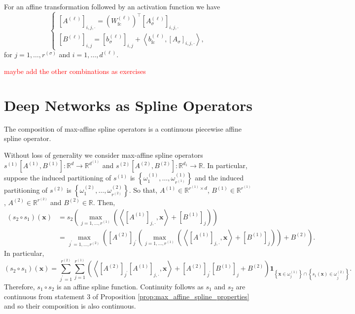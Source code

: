 \begin{example}
    For an affine transformation followed by an activation function we have $$\begin{cases}\left[A^{(\ell)}\right]_{i,j,\cdot}=\left(W_{\text{fc}}^{(\ell)}\right)^\top\left[A_{\sigma}^{(\ell)}\right]_{i,j,\cdot}\\\left[B^{(\ell)}\right]_{i,j}=\left[b_{\sigma}^{(\ell)}\right]_{i,j}+\left\langle b_{\text{fc}}^{(\ell)},\left[A_{\sigma}\right]_{i,j,\cdot}\right\rangle,\end{cases}$$for $j=1,\dots,r^{(\sigma)}$ and $i=1,\dots,d^{(\ell)}$.
\end{example}

\textcolor{Red}{maybe add the other combinations as exercises}

\section{Deep Networks as Spline Operators}\label{sec:dn_as_so}

\begin{proposition}
    The composition of max-affine spline operators is a continuous piecewise affine spline operator.
\end{proposition}

\begin{tproof}
    Without loss of generality we consider max-affine spline operators $s^{(1)}\left[A^{(1)},B^{(1)}\right]:\mathbb{R}^d\to\mathbb{R}^{d^{(1)}}$ and $s^{(2)}\left[A^{(2)},B^{(2)}\right]:\mathbb{R}^{d_1}\to\mathbb{R}$. In particular, suppose the induced partitioning of $s^{(1)}$ is $\left\{\omega^{(1)}_1,\dots,\omega^{(1)}_{r^{(1)}}\right\}$ and the induced partitioning of $s^{(2)}$ is $\left\{\omega^{(2)}_1,\dots,\omega^{(2)}_{r^{(2)}}\right\}$. So that, $A^{(1)}\in\mathbb{R}^{r^{(1)}\times d}$, $B^{(1)}\in\mathbb{R}^{r^{(1)}}$, $A^{(2)}\in\mathbb{R}^{r^{(2)}}$ and $B^{(2)}\in\mathbb{R}$. Then,
    \begin{align*}
        \left(s_2\circ s_1\right)(\mathbf{x})&=s_2\left(\max_{j=1,\dots,r^{(1)}}\left(\left\langle\left[A^{(1)}\right]_{j,\cdot},\mathbf{x}\right\rangle+\left[B^{(1)}\right]_j\right)\right)\\&=\max_{j^\prime=1,\dots,r^{(2)}}\left(\left[A^{(2)}\right]_{j^\prime}\left(\max_{j=1,\dots,r^{(1)}}\left(\left\langle\left[A^{(1)}\right]_{j,\cdot},\mathbf{x}\right\rangle+\left[B^{(1)}\right]_j\right)\right)+B^{(2)}\right).
    \end{align*}
    In particular, $$\left(s_2\circ s_1\right)(\mathbf{x})=\sum_{j^\prime=1}^{r^{(2)}}\sum_{j=1}^{r^{(1)}}\left(\left\langle\left[A^{(2)}\right]_{j^\prime}\left[A^{(1)}\right]_{j,\cdot},\mathbf{x}\right\rangle+\left[A^{(2)}\right]_{j^\prime}\left[B^{(1)}\right]_j+B^{(2)}\right)\mathbf{1}_{\left\{\mathbf{x}\in\omega^{(1)}_j\right\}\cap\left\{s_1(\mathbf{x})\in\omega^{(2)}_{j^\prime}\right\}}.$$Therefore, $s_1\circ s_2$ is an affine spline function. Continuity follows as $s_1$ and $s_2$ are continuous from statement 3 of Proposition \ref{prop:max_affine_spline_properties} and so their composition is also continuous.
\end{tproof}

